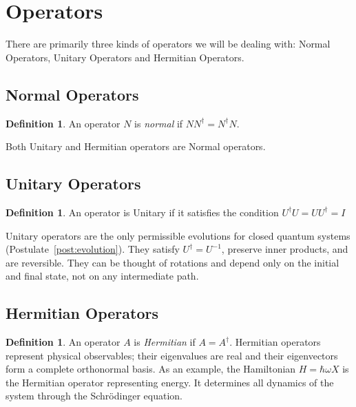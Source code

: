 \documentclass[12pt, a4paper, oneside]{report}
\theoremstyle{plain}
\theoremstyle{definition}
\newtheorem{definition}[theorem]{Definition}
\theoremstyle{remark}
\begin{document}
\section{Operators}

There are primarily three kinds of operators we will be dealing with: Normal Operators, Unitary Operators and Hermitian Operators.

\subsection{Normal Operators}
\begin{definition}
	An operator $N$ is \emph{normal} if $NN^\dagger = N^\dagger N$.
\end{definition}

Both Unitary and Hermitian operators are Normal operators.

\subsection{Unitary Operators}
\begin{definition}
	An operator is Unitary if it satisfies the condition $U^\dagger U = U U^\dagger = I$
\end{definition}
Unitary operators are the only permissible evolutions for closed quantum systems
(Postulate~\ref{post:evolution}). They satisfy $U^\dagger = U^{-1}$, preserve inner products,
and are reversible. They can be thought of rotations and depend only on the initial and final state, not
on any intermediate path.

\subsection{Hermitian Operators}

\begin{definition}
	An operator $A$ is \emph{Hermitian} if $A = A^\dagger$. Hermitian operators represent
	physical observables; their eigenvalues are real and their eigenvectors form a complete
	orthonormal basis.
	As an example, the Hamiltonian $H = \hbar\omega X$ is the Hermitian operator representing energy. It
	determines all dynamics of the system through the Schr\"{o}dinger equation.


\end{definition}



\end{document}
